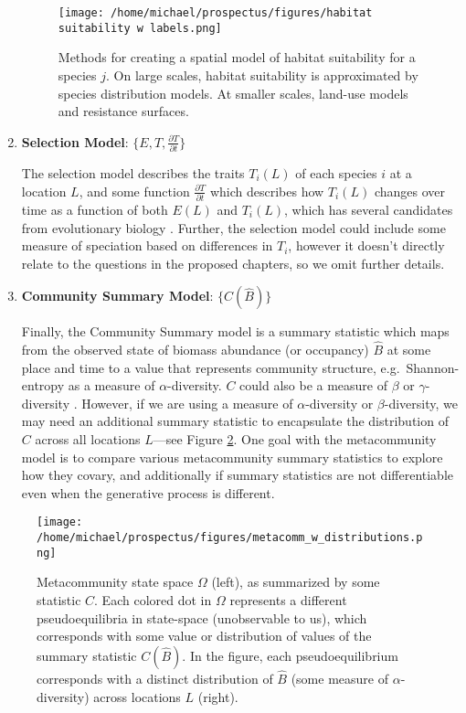 \documentclass[]{article}
\begin{document}
\begin{enumerate}
  \begin{figure}[H]
  \centering
  \texttt{[image: /home/michael/prospectus/figures/habitat suitability w labels.png]}
  \caption{Methods for creating a spatial model of habitat suitability for a species $j$. On large scales, habitat suitability is approximated by species distribution models. At smaller scales, land-use models and resistance surfaces.}
  \label{fig:habitat_suitability}
  \end{figure}
\item
  \textbf{Selection Model}: \(\{ E, T, \frac{\partial T}{\partial t}\}\)

  The selection model describes the traits \(T_i(L)\) of each species
  \(i\) at a location \(L\), and some function
  \(\frac{\partial T}{\partial t}\) which describes how \(T_i(L)\)
  changes over time as a function of both \(E(L)\) and \(T_i(L)\), which
  has several candidates from evolutionary biology
  \citep{price_selection_1970, queller_fundamental_2017}. Further, the selection model could include some measure of speciation based on differences in \(T_i\), however it
  doesn't directly relate to the questions in the proposed chapters, so we omit further details.
\item
  \textbf{Community Summary Model}: \(\{ C(\hat{B}) \}\)

  Finally, the Community Summary model is a summary statistic which maps
  from the observed state of biomass abundance (or occupancy)
  \(\hat{B}\) at some place and time to a value that represents
  community structure, e.g.~Shannon-entropy as a measure of
  \(\alpha\)-diversity. \(C\) could also be a measure of \(\beta\) or
  \(\gamma\)-diversity \cite{poisot_dissimilarity_2012}. However, if we are using a measure of
  \(\alpha\)-diversity or $\beta$-diversity,  we may need an additional summary statistic
  to encapsulate the distribution of \(C\) across all locations \(L\)---see Figure \ref{fig:metacommunity_space_w_distr}. One goal with the metacommunity model is to compare
  various metacommunity summary statistics to explore how they covary, and additionally if summary statistics are not differentiable even when the
  generative process is different.
\end{enumerate}

\begin{figure}[H]
\centering
\texttt{[image: /home/michael/prospectus/figures/metacomm\_w\_distributions.png]}
\caption{Metacommunity state space $\Omega$ (left), as summarized by some statistic $C$. Each colored dot in $\Omega$ represents a different pseudoequilibria in state-space (unobservable to us), which corresponds with some value or distribution of values of the summary statistic $C(\hat{B})$. In the figure, each pseudoequilibrium corresponds with a distinct distribution of $\hat{B}$ (some measure of $\alpha$-diversity) across locations $L$ (right).}\label{fig:metacommunity_space_w_distr}
\end{figure}
\end{document}

